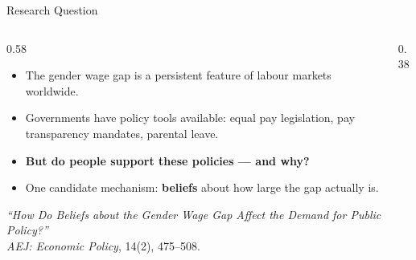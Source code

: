 \documentclass[aspectratio=169, 11pt]{beamer}
\begin{document}
\begin{frame}[t]{Research Question}
\begin{columns}[T]
\begin{column}{0.58\textwidth}
\begin{itemize}
  \setlength\itemsep{0.5em}
  \item The gender wage gap is a persistent feature of labour markets worldwide.
  \item Governments have policy tools available: equal pay legislation, pay transparency mandates, parental leave.
  \item \textbf{But do people support these policies — and why?}
  \item One candidate mechanism: \textbf{beliefs} about how large the gap actually is.
\end{itemize}
\vspace{0.5em}
\begin{keybox}
\textit{``How Do Beliefs about the Gender Wage Gap Affect the Demand for Public Policy?''}\\
\textit{AEJ: Economic Policy}, 14(2), 475--508.
\end{keybox}
\end{column}
\begin{column}{0.38\textwidth}
\begin{center}
\end{center}
\end{column}
\end{columns}
\end{frame}

\end{document}
